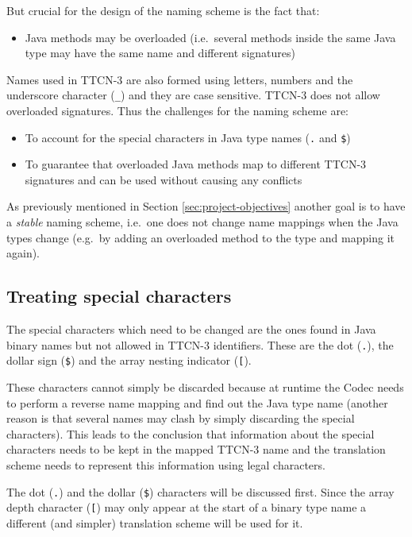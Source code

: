 But crucial for the design of the naming scheme is the fact that:

\begin{itemize}
\item Java methods may be overloaded
(i.e.\ several methods inside the same Java type may have the same name
and different signatures)
\end{itemize}

Names used in \ac{TTCN-3} are also formed using
letters, numbers and the underscore character (\verb=_=)
and they are case sensitive.
\ac{TTCN-3} does not allow overloaded signatures.
Thus the challenges for the naming scheme are:

\begin{itemize}
\item To account for the special characters in Java type names
(\verb=.= and \verb=$=)
\item To guarantee that overloaded Java methods
map to different \ac{TTCN-3} signatures
and can be used without causing any conflicts
\end{itemize}

As previously mentioned in Section \ref{sec:project-objectives}
another goal is to have a \emph{stable} naming scheme,
i.e.\ one does not change name mappings when the Java types change
(e.g.\ by adding an overloaded method to the type and mapping it again).


\subsection{Treating special characters}
\label{sec:special-characters}

The special characters which need to be changed
are the ones found in Java binary names
but not allowed in \ac{TTCN-3} identifiers.
These are the dot (\verb=.=), the dollar sign (\verb=$=)
and the array nesting indicator (\verb=[=).

These characters cannot simply be discarded because
at runtime the Codec needs to perform a reverse name mapping
and find out the Java type name
(another reason is that several names may clash
by simply discarding the special characters).
This leads to the conclusion that information about the special characters
needs to be kept in the mapped \ac{TTCN-3} name
and the translation scheme needs to represent this information
using legal characters.

The dot (\verb=.=) and the dollar (\verb=$=) characters
will be discussed first.
Since the array depth character (\verb=[=)
may only appear at the start of a binary type name
a different (and simpler) translation scheme will be used for it.


